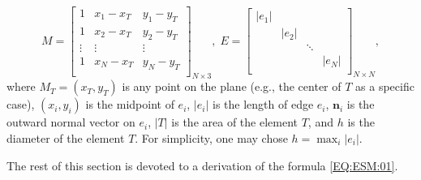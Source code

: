 \documentclass[final,leqno]{siamltex704}
\begin{document}
\begin{theorem}
\begin{equation*}
M=
\begin{bmatrix}
1      & x_{1} - x_T & y_{1} - y_T\\
1      & x_{2} - x_T & y_{2} - y_T\\
\vdots & \vdots        & \vdots       \\
1      & x_{N} - x_T & y_{N} - y_T\\
\end{bmatrix}_{N\times3},\;
E=
\begin{bmatrix}
|e_1| &       &           &       \\  %
      & |e_2| &           &       \\
      &       & \ddots    &       \\
      &       &           & |e_N| \\
\end{bmatrix}_{N\times N},
\end{equation*}
where $M_T=(x_T,y_T)$ is any point on the plane (e.g., the center of $T$ as a specific case), $(x_i, y_i)$ is the midpoint of $e_i$, $|e_i|$ is the length of edge $e_i$, $\bm{n}_i$ is the outward normal vector on $e_i$, $|T|$ is the area of the element $T$, and $h$ is the diameter of the element $T$. For simplicity, one may chose $h=\max_i{|e_i|}$.
\end{theorem}

\medskip
The rest of this section is devoted to a derivation of the formula \eqref{EQ:ESM:01}.
\end{document}

